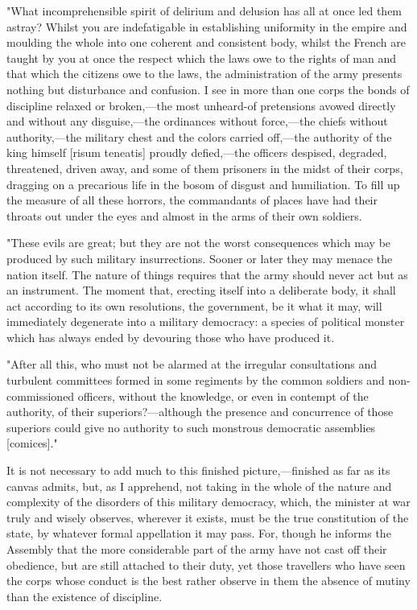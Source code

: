 "What incomprehensible spirit of delirium and delusion has all at once led them astray? Whilst you are indefatigable in establishing uniformity in the empire and moulding the whole into one coherent and consistent body, whilst the French are taught by you at once the respect which the laws owe to the rights of man and that which the citizens owe to the laws, the administration of the army presents nothing but disturbance and confusion. I see in more than one corps the bonds of discipline relaxed or broken,—the most unheard-of pretensions avowed directly and without any disguise,—the ordinances without force,—the chiefs without authority,—the military chest and the colors carried off,—the authority of the king himself [risum teneatis] proudly defied,—the officers despised, degraded, threatened, driven away, and some of them prisoners in the midst of their corps, dragging on a precarious life in the bosom of disgust and humiliation. To fill up the measure of all these horrors, the commandants of places have had their throats out under the eyes and almost in the arms of their own soldiers.

"These evils are great; but they are not the worst consequences which may be produced by such military insurrections. Sooner or later they may menace the nation itself. The nature of things requires that the army should never act but as an instrument. The moment that, erecting itself into a deliberate body, it shall act according to its own resolutions, the government, be it what it may, will immediately degenerate into a military democracy: a species of political monster which has always ended by devouring those who have produced it.

"After all this, who must not be alarmed at the irregular consultations and turbulent committees formed in some regiments by the common soldiers and non-commissioned officers, without the knowledge, or even in contempt of the authority, of their superiors?—although the presence and concurrence of those superiors could give no authority to such monstrous democratic assemblies [comices]."

It is not necessary to add much to this finished picture,—finished as far as its canvas admits, but, as I apprehend, not taking in the whole of the nature and complexity of the disorders of this military democracy, which, the minister at war truly and wisely observes, wherever it exists, must be the true constitution of the state, by whatever formal appellation it may pass. For, though he informs the Assembly that the more considerable part of the army have not cast off their obedience, but are still attached to their duty, yet those travellers who have seen the corps whose conduct is the best rather observe in them the absence of mutiny than the existence of discipline.

